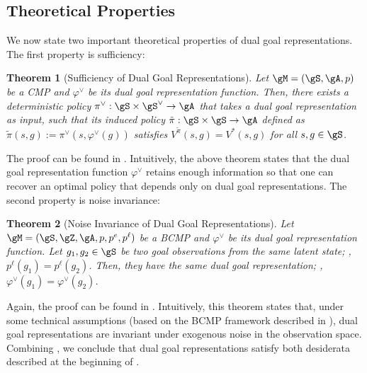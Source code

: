 \documentclass[final]{article} %
\theoremstyle{plain}
\newtheorem{theorem}{Theorem}[section]
\theoremstyle{definition}
\theoremstyle{remark}
\renewcommand{\phi}{\varphi}
\newcommand{\cutsubsectionup}{\vspace{-2pt}}
\newcommand{\cutsubsectiondown}{\vspace{-3pt}}
\begin{document}
\cutsubsectionup
\subsection{Theoretical Properties}
\cutsubsectiondown

We now state two important theoretical properties of dual goal representations.
The first property is sufficiency:

\begin{theorem}[Sufficiency of Dual Goal Representations] \label{thm:suff}
Let $\gM=(\gS, \gA, p)$ be a CMP and $\phi^\vee$ be its dual goal representation function.
Then, there exists a deterministic policy $\pi^\vee: \gS \times \gS^\vee \to \gA$ that takes a dual goal representation as input,
such that its induced policy $\tilde \pi: \gS \times \gS \to \gA$ defined as
$\tilde \pi(s, g) := \pi^\vee(s, \phi^\vee(g))$ satisfies $V^{\tilde \pi} (s, g) = V^*(s, g)$ for all $s, g \in \gS$.
\end{theorem}

The proof can be found in .
Intuitively, the above theorem states that the dual goal representation function $\phi^\vee$ retains enough information
so that one can recover an optimal policy that depends only on dual goal representations.
The second property is noise invariance:

\begin{theorem}[Noise Invariance of Dual Goal Representations] \label{thm:min}
Let $\gM=(\gS, \gZ, \gA, p, p^e, p^\ell)$ be a BCMP and $\phi^\vee$ be its dual goal representation function.
Let $g_1, g_2 \in \gS$ be two goal observations from the same latent state; \ie, $p^\ell(g_1) = p^\ell(g_2)$.
Then, they have the same dual goal representation; \ie, $\phi^\vee(g_1) = \phi^\vee(g_2)$.
\end{theorem}

Again, the proof can be found in .
Intuitively, this theorem states that, under some technical assumptions (based on the BCMP framework described in ),
dual goal representations are invariant under exogenous noise in the observation space.
Combining , we conclude that dual goal representations satisfy
both desiderata described at the beginning of .
%
\end{document}
